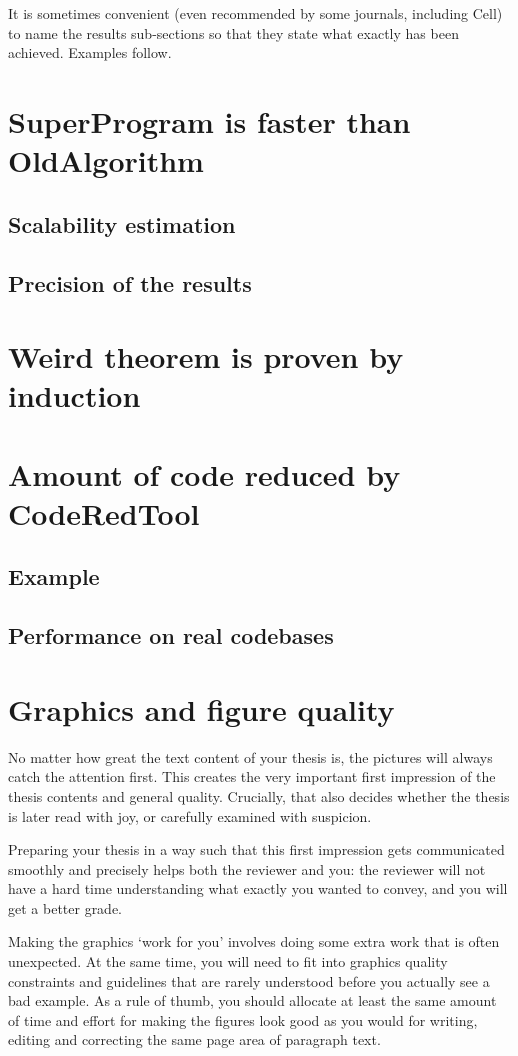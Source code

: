 It is sometimes convenient (even recommended by some journals, including Cell) to name the results sub-sections so that they state what exactly has been achieved. Examples follow.

\section{SuperProgram is faster than OldAlgorithm}
\subsection{Scalability estimation}
\subsection{Precision of the results}
\section{Weird theorem is proven by induction}
\section{Amount of code reduced by CodeRedTool}
\subsection{Example}
\subsection{Performance on real codebases}
\section{Graphics and figure quality}

No matter how great the text content of your thesis is, the pictures will always catch the attention first. This creates the very important first impression of the thesis contents and general quality. Crucially, that also decides whether the thesis is later read with joy, or carefully examined with suspicion.

Preparing your thesis in a way such that this first impression gets communicated smoothly and precisely helps both the reviewer and you: the reviewer will not have a hard time understanding what exactly you wanted to convey, and you will get a better grade.

Making the graphics `work for you' involves doing some extra work that is often unexpected. At the same time, you will need to fit into graphics quality constraints and guidelines that are rarely understood before you actually see a bad example. As a rule of thumb, you should allocate at least the same amount of time and effort for making the figures look good as you would for writing, editing and correcting the same page area of paragraph text.

